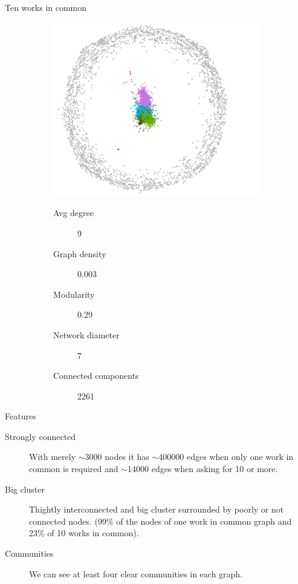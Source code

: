 \begin{frame}{Ten works in common}
\begin{figure}
	\begin{subfigure}{.55\linewidth}
		\includegraphics[scale=0.55, left]{graphics/atLeast10WorksCommunity.png} 
	\end{subfigure}%
	\begin{subfigure}{.45\linewidth}
		\begin{description}
		\item[Avg degree] 9
		\item[Graph density] 0.003
		\item[Modularity] 0.29
		\item[Network diameter] 7
		\item[Connected components] 2261
		\end{description}
	\end{subfigure}
\end{figure}
\end{frame}

\begin{frame}{Features}
\begin{description}
	\item [Strongly connected] With merely $\sim$3000 nodes it has $\sim$400000 edges when only one work in common is required and $\sim$14000 edges when asking for 10 or more. 
	\item [Big cluster] Thightly interconnected and big cluster surrounded by poorly or not connected nodes. (99\% of the nodes of one work in common graph and 23\% of 10 works in common). 
	\item [Communities] We can see at least four clear communities in each graph.
\end{description}
\end{frame}

